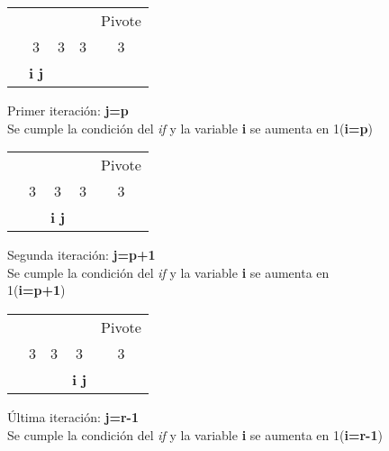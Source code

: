     \begin{figure}[h!]
        \centering
        \begin{tabular}{p{1cm}p{1cm}p{1cm}p{1cm}p{1cm}}
            & & & & {\small Pivote} \\\cline{2-5}
            & \multicolumn{1}{|c|}{3} & \multicolumn{1}{c|}{3} & \multicolumn{1}{c|}{3} & \multicolumn{1}{c|}{3} \\ \cline{2-5}
            & \textbf{i} \textbf{j} & & & \\
        \end{tabular}
        \caption{Primer iteración: \textbf{j=p}\\Se cumple la condición del \textit{if} y la variable \textbf{i} se aumenta en 1(\textbf{i=p})}
        \label{fig:my_label}
    \end{figure}
    
    \begin{figure}[h!]
        \centering
        \begin{tabular}{p{1cm}p{1cm}p{1cm}p{1cm}p{1cm}}
            & & & & {\small Pivote} \\\cline{2-5}
            & \multicolumn{1}{|c|}{3} & \multicolumn{1}{c|}{3} & \multicolumn{1}{c|}{3} & \multicolumn{1}{c|}{3} \\ \cline{2-5}
            & & \textbf{i} \textbf{j} & & \\
        \end{tabular}
        \caption{Segunda iteración: \textbf{j=p+1}\\Se cumple la condición del \textit{if} y la variable \textbf{i} se aumenta en 1(\textbf{i=p+1})}
        \label{fig:my_label}
    \end{figure}
    
    \begin{figure}[h!]
        \centering
        \begin{tabular}{p{1cm}p{1cm}p{1cm}p{1cm}p{1cm}}
            & & & & {\small Pivote} \\\cline{2-5}
            & \multicolumn{1}{|c|}{3} & \multicolumn{1}{c|}{3} & \multicolumn{1}{c|}{3} & \multicolumn{1}{c|}{3} \\ \cline{2-5}
            & & & \textbf{i} \textbf{j} & \\
        \end{tabular}
        \caption{Última iteración: \textbf{j=r-1}\\Se cumple la condición del \textit{if} y la variable \textbf{i} se aumenta en 1(\textbf{i=r-1})}
        \label{fig:my_label}
    \end{figure}
    

